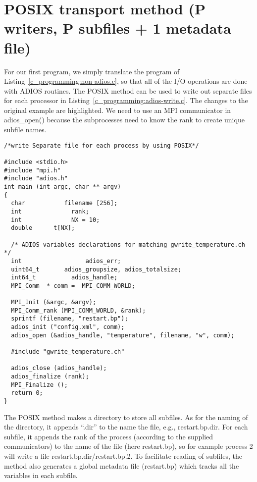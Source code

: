\section{POSIX transport method (P writers, P subfiles + 1 metadata file)}

For our first program, we simply translate the program of
Listing~\ref{c_programming:non-adios.c}, so that all of the I/O operations
are done with ADIOS routines. The POSIX method can be used to write out
separate files for each processor in
Listing~\ref{c_programming:adios-write.c}. 
The changes to the original
example are highlighted. We need to use an MPI communicator in adios\_open()
because the subprocesses need to know the rank to create unique subfile
names.

\begin{lstlisting}[alsolanguage=C,caption=Example adios program to write P files from 
P processors (examples/C/manual/2\_adios\_write.c]
/*write Separate file for each process by using POSIX*/

#include <stdio.h>
#include "mpi.h"
#include "adios.h"
int main (int argc, char ** argv) 
{
  char           filename [256];
  int              rank;
  int              NX = 10;
  double      t[NX];

  /* ADIOS variables declarations for matching gwrite_temperature.ch */
  int                  adios_err;
  uint64_t       adios_groupsize, adios_totalsize;
  int64_t          adios_handle;
  MPI_Comm  * comm =  MPI_COMM_WORLD;

  MPI_Init (&argc, &argv);
  MPI_Comm_rank (MPI_COMM_WORLD, &rank);
  sprintf (filename, "restart.bp");
  adios_init ("config.xml", comm);
  adios_open (&adios_handle, "temperature", filename, "w", comm);

  #include "gwrite_temperature.ch"

  adios_close (adios_handle);
  adios_finalize (rank);
  MPI_Finalize ();
  return 0;
}
\end{lstlisting}\label{c_programming:adios-write.c}

The POSIX method makes a directory to store all subfiles. As for the naming of 
the directory, it appends ``.dir'' to the name the file, e.g., restart.bp.dir. 
For each subfile, it appends the rank of the process (according to the supplied 
communicators) to the name of the file (here restart.bp), so for example process 
2 will write a file restart.bp.dir/restart.bp.2. To facilitate reading of subfiles, 
the method also generates a global metadata file (restart.bp) which tracks all 
the variables in each subfile. 

